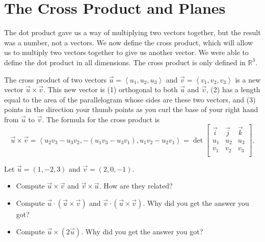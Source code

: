 \section{The Cross Product and Planes}

The dot product gave us a way of multiplying two vectors together, but the result was a number, not a vectors. We now define the cross product, which will allow us to multiply two vectors together to give us another vector.  We were able to define the dot product in all dimensions.  The cross product is only defined in $\mathbb{R}^3$. 

\begin{definition}
The cross product of two vectors $\vec u = \left<u_1,u_2,u_3\right>$ and $\vec v = \left<v_1,v_2,v_3\right>$ is a new vector $\vec u\times \vec v$. This new vector is (1) orthogonal to both $\vec u$ and $\vec v$, (2) has a length equal to the area of the parallelogram whose sides are these two vectors, and (3) points in the direction your thumb points as you curl the base of your right hand from $\vec u$ to $\vec v$. The formula for the cross product is $$\vec u\times \vec v = \left<u_2v_3-u_3v_2,-(u_1v_3-u_3v_1),u_1v_2-u_2v_1\right> = \det\begin{bmatrix}\vec i & \vec j&\vec k\\ u_1&u_2&u_3\\ v_1&v_2&v_3\\\end{bmatrix}.$$
\end{definition}

\begin{problem}  
Let $\vec u=(1,-2,3)$ and $\vec v=(2,0,-1)$.  
\begin{itemize}
\item Compute $\vec u\times \vec v$ and $\vec v\times \vec u$.  How are they related?
\item Compute $\vec u \cdot (\vec u\times \vec v)$ and $\vec v \cdot (\vec u\times \vec v)$. Why did you get the answer you got?
\item Compute $\vec u \times (2\vec u)$.  Why did you get the answer you got?
\end{itemize}
\end{problem}

